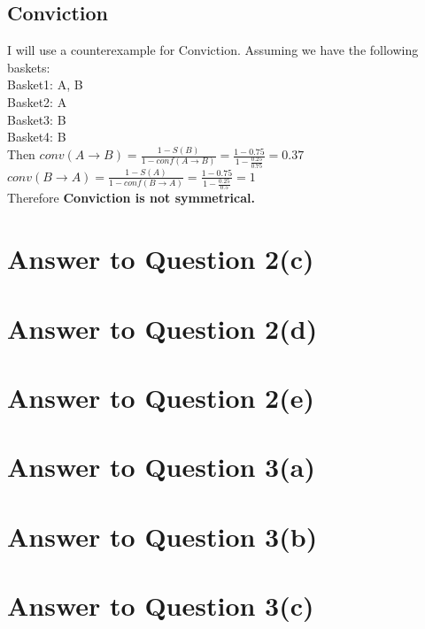 \documentclass[11pt]{article}
\begin{document}
\subsection*{Conviction}
I will use a counterexample for Conviction. Assuming we have the following baskets:\\
Basket1: A, B \\
Basket2: A\\
Basket3: B\\
Basket4: B\\
Then $ conv(A \rightarrow B) = \frac{1-S(B)}{1 - conf(A \rightarrow B)} = \frac{1 - 0.75}{1 - \frac{0.25}{0.75}} = 0.37$ \\
$ conv(B \rightarrow A) = \frac{1-S(A)}{1 - conf(B \rightarrow A)} = \frac{1 - 0.75}{1 - \frac{0.25}{0.5}} = 1$\\
 Therefore \textbf{Conviction is not symmetrical.}
\pagebreak[4]
\section*{Answer to Question 2(c)}

\pagebreak[4]
\section*{Answer to Question 2(d)}

\pagebreak[4]
\section*{Answer to Question 2(e)}

\pagebreak[4]
\section*{Answer to Question 3(a)}

\pagebreak[4]
\section*{Answer to Question 3(b)}

\pagebreak[4]
\section*{Answer to Question 3(c)}
\end{document}
